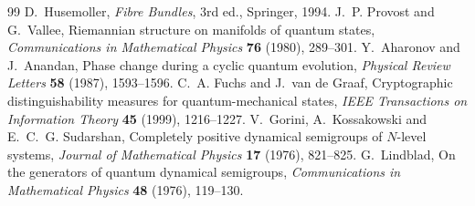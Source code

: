 \documentclass[11pt]{article}
\theoremstyle{definition}
\begin{document}
\begin{thebibliography}{99}
 D.~Husemoller, \emph{Fibre Bundles}, 3rd ed., Springer, 1994.
 J.~P. Provost and G.~Vallee, Riemannian structure on manifolds of quantum states, \emph{Communications in Mathematical Physics} \textbf{76} (1980), 289--301.
 Y.~Aharonov and J.~Anandan, Phase change during a cyclic quantum evolution, \emph{Physical Review Letters} \textbf{58} (1987), 1593--1596.
 C.~A. Fuchs and J.~van de Graaf, Cryptographic distinguishability measures for quantum-mechanical states, \emph{IEEE Transactions on Information Theory} \textbf{45} (1999), 1216--1227.
 V.~Gorini, A.~Kossakowski and E.~C.~G. Sudarshan, Completely positive dynamical semigroups of $N$-level systems, \emph{Journal of Mathematical Physics} \textbf{17} (1976), 821--825.
 G.~Lindblad, On the generators of quantum dynamical semigroups, \emph{Communications in Mathematical Physics} \textbf{48} (1976), 119--130.
\end{thebibliography}
\endgroup
\end{document}
